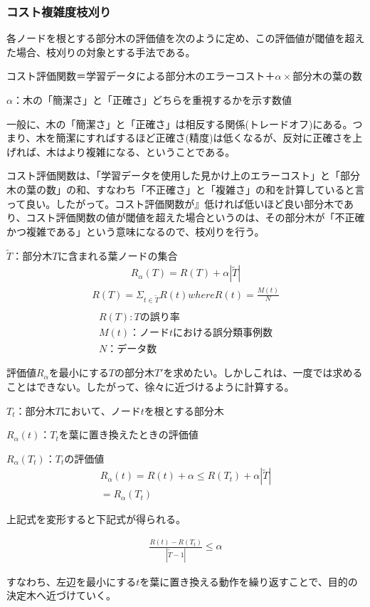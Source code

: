 \documentclass[dvipdfmx]{jsarticle}
\begin{document}
\subsubsection{コスト複雑度枝刈り}
各ノードを根とする部分木の評価値を次のように定め、この評価値が閾値を超えた場合、枝刈りの対象とする手法である。
\begin{center}
  コスト評価関数＝学習データによる部分木のエラーコスト＋$\alpha \times$部分木の葉の数 \par
  $\alpha$：木の「簡潔さ」と「正確さ」どちらを重視するかを示す数値
\end{center}
一般に、木の「簡潔さ」と「正確さ」は相反する関係(トレードオフ)にある。つまり、木を簡潔にすればするほど正確さ(精度)は低くなるが、反対に正確さを上げれば、木はより複雑になる、ということである。\par
コスト評価関数は、「学習データを使用した見かけ上のエラーコスト」と「部分木の葉の数」の和、すなわち「不正確さ」と「複雑さ」の和を計算していると言って良い。したがって。コスト評価関数が』低ければ低いほど良い部分木であり、コスト評価関数の値が閾値を超えた場合というのは、その部分木が「不正確かつ複雑である」という意味になるので、枝刈りを行う。
\begin{center}
  $\tilde{T}：部分木Tに含まれる葉ノードの集合$
  \begin{align*}
    R_{\alpha}(T) = R(T) + \alpha|\tilde{T}|
  \end{align*}
  \begin{align*}
    R(T) = \Sigma_{t \in \tilde{T}}R(t) whereR(t) = \frac{M(t)}{N}\\
  \end{align*}
  \begin{align*}
    R(T):Tの誤り率\\
    M(t)：ノードtにおける誤分類事例数\\
    N：データ数
  \end{align*}
\end{center}
評価値$R_{\alpha}$を最小にする$T$の部分木$T'$を求めたい。しかしこれは、一度では求めることはできない。したがって、徐々に近づけるように計算する。
\begin{center}
  $T_{t}：部分木Tにおいて、ノードtを根とする部分木$ \par
  $R_{\alpha}(t)：T_{t}を葉に置き換えたときの評価値$ \par
  $R_{\alpha}(T_{t})：T_{t}の評価値$
  \begin{align*}
      R_{\alpha}(t) = R(t) + \alpha \leq R(T_{t})+\alpha|\tilde{T}|\\
      =R_{\alpha}(T_{t})
  \end{align*}
\end{center}
上記式を変形すると下記式が得られる。
\begin{center}
  \begin{align}
    \frac{R(t)-R(T_{t})}{|\tilde{T}-1|} \leq \alpha
  \end{align}
\end{center}
すなわち、左辺を最小にする$t$を葉に置き換える動作を繰り返すことで、目的の決定木へ近づけていく。
\end{document}
